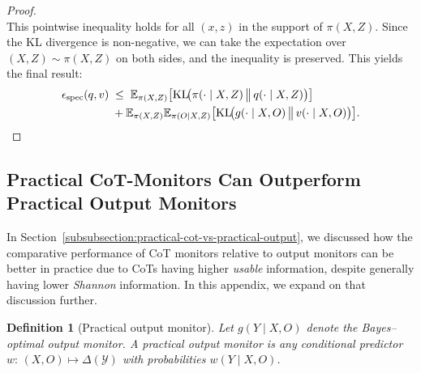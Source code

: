 \documentclass{article}
\theoremstyle{plain}
\newtheorem{definition}[theorem]{Definition}
\begin{document}
\begin{proof}
\[\]
This pointwise inequality holds for all $(x,z)$ in the support of $\pi(X,Z)$. Since the KL divergence is non-negative, we can take the expectation over $(X,Z) \sim \pi(X,Z)$ on both sides, and the inequality is preserved. This yields the final result:
\begin{align*}
\epsilon_{\mathrm{spec}}(q,v) \;&\le\; 
\mathbb{E}_{\pi(X,Z)} \big[\mathrm{KL}\!\big(\pi(\cdot\mid X,Z)\,\big\|\,q(\cdot\mid X,Z)\big)\big] \\
&+ \mathbb{E}_{\pi(X,Z)}\mathbb{E}_{\pi(O\mid X,Z)} \big[\mathrm{KL}\!\big(g(\cdot\mid X,O)\,\big\|\,v(\cdot\mid X,O)\big)\big]. \qedhere
\end{align*}
\end{proof}

\color{black}
\subsection{Practical CoT-Monitors Can Outperform Practical Output Monitors}
\label{appx:practical-cot-vs-practical-output-monitors}
In Section~\ref{subsubsection:practical-cot-vs-practical-output}, we discussed how the comparative performance of CoT monitors relative to output monitors can be better in practice due to CoTs having higher \textit{usable} information, despite generally having lower \textit{Shannon} information.
In this appendix, we expand on that discussion further.

\begin{definition}[Practical output monitor]
\label{def:practical-output-monitor}
Let $g(Y\mid X,O)$ denote the Bayes–optimal output monitor.
A \emph{practical output monitor} is any conditional predictor
\(
w:\,(X,O)\mapsto \Delta(\mathcal Y)
\)
with probabilities $w(Y\mid X,O)$.
\end{definition}

\end{document}
